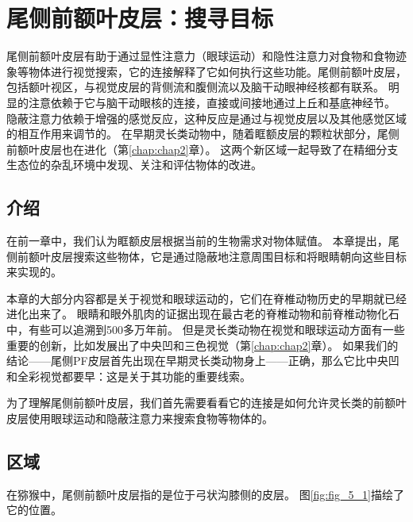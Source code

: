 \chapter{尾侧前额叶皮层：搜寻目标} \label{chap:chap5}

尾侧前额叶皮层有助于通过显性注意力（眼球运动）和隐性注意力对食物和食物迹象等物体进行视觉搜索，它的连接解释了它如何执行这些功能。尾侧前额叶皮层，包括额叶视区，与视觉皮层的背侧流和腹侧流以及脑干动眼神经核都有联系。
明显的注意依赖于它与脑干动眼核的连接，直接或间接地通过上丘和基底神经节。
隐蔽注意力依赖于增强的感觉反应，这种反应是通过与视觉皮层以及其他感觉区域的相互作用来调节的。
在早期灵长类动物中，随着眶额皮层的颗粒状部分，尾侧前额叶皮层也在进化（第\ref{chap:chap2}章）。
这两个新区域一起导致了在精细分支生态位的杂乱环境中发现、关注和评估物体的改进。



\section{介绍}

在前一章中，我们认为眶额皮层根据当前的生物需求对物体赋值。
本章提出，尾侧前额叶皮层搜索这些物体，它是通过隐蔽地注意周围目标和将眼睛朝向这些目标来实现的。


本章的大部分内容都是关于视觉和眼球运动的，它们在脊椎动物历史的早期就已经进化出来了。
眼睛和眼外肌肉的证据出现在最古老的脊椎动物和前脊椎动物化石中，有些可以追溯到500多万年前\cite{Shu et al. 2003}。
但是灵长类动物在视觉和眼球运动方面有一些重要的创新，比如发展出了中央凹和三色视觉（第\ref{chap:chap2}章）。
如果我们的结论——尾侧PF皮层首先出现在早期灵长类动物身上——正确，那么它比中央凹和全彩视觉都要早：这是关于其功能的重要线索。


为了理解尾侧前额叶皮层，我们首先需要看看它的连接是如何允许灵长类的前额叶皮层使用眼球运动和隐蔽注意力来搜索食物等物体的。



\section{区域}

在猕猴中，尾侧前额叶皮层指的是位于弓状沟膝侧的皮层。
图\ref{fig:fig_5_1}描绘了它的位置。


